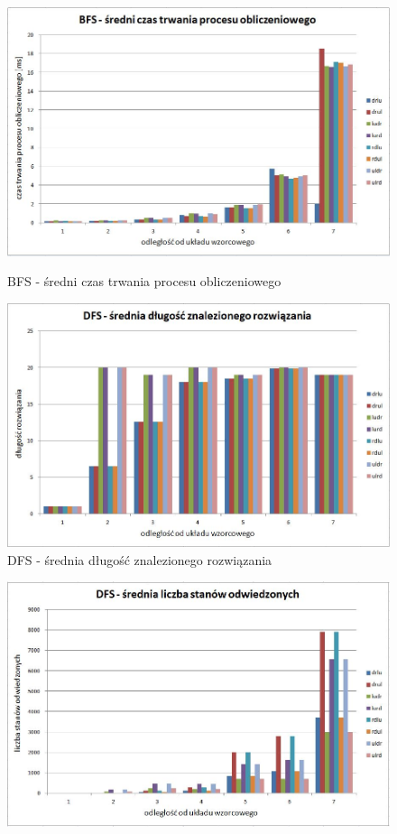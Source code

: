 \documentclass{classrep}
\begin{document}
{\begin{figure}[ht!]
\begin{center}
		\includegraphics[scale=0.6]{bfs5}
		\caption{BFS - średni czas trwania procesu obliczeniowego}
		\vspace{0.5in}
		\includegraphics[scale=0.6]{dfs1}
		\caption{DFS - średnia długość znalezionego rozwiązania}
	\end{center}
\end{figure}
\newpage
\begin{figure}[ht!]
	\begin{center}
		\vspace{0.3in}
		\includegraphics[scale=0.6]{dfs2}

\end{center}
\end{figure}}
\end{document}
